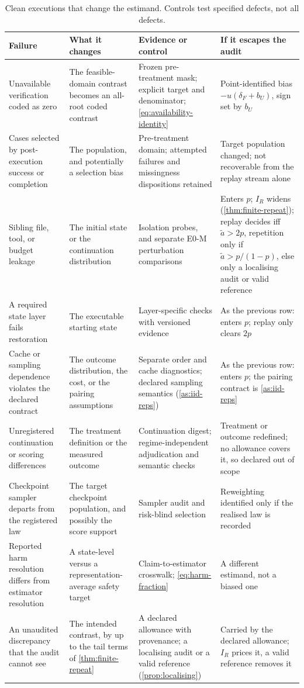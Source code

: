 \begin{table}[H]
\centering
\footnotesize
\setlength{\tabcolsep}{3.5pt}
\begin{tabular}{@{}p{2.7cm}p{3.1cm}p{4.0cm}p{4.4cm}@{}}
\toprule
Failure & What it changes & Evidence or control & If it escapes the audit \\
\midrule
Unavailable verification coded as zero & The feasible-domain contrast becomes an all-root coded contrast & Frozen pre-treatment mask; explicit target and denominator; \eqref{eq:availability-identity} & Point-identified bias $-u(\delta_F+b_U)$, sign set by $b_U$ \\
Cases selected by post-execution success or completion & The population, and potentially a selection bias & Pre-treatment domain; attempted failures and missingness dispositions retained & Target population changed; not recoverable from the replay stream alone \\
Sibling file, tool, or budget leakage & The initial state or the continuation distribution & Isolation probes, and separate E0-M perturbation comparisons & Enters $p$; $I_R$ widens (\cref{thm:finite-repeat}); replay decides iff $\tilde a>2p$, repetition only if $\tilde a>p/(1-p)$, else only a localising audit or valid reference \\
A required state layer fails restoration & The executable starting state & Layer-specific checks with versioned evidence & As the previous row: enters $p$; replay only clears $2p$ \\
Cache or sampling dependence violates the declared contract & The outcome distribution, the cost, or the pairing assumptions & Separate order and cache diagnostics; declared sampling semantics (\cref{as:iid-reps}) & As the previous row: enters $p$; the pairing contract is \cref{as:iid-reps} \\
Unregistered continuation or scoring differences & The treatment definition or the measured outcome & Continuation digest; regime-independent adjudication and semantic checks & Treatment or outcome redefined; no allowance covers it, so declared out of scope \\
Checkpoint sampler departs from the registered law & The target checkpoint population, and possibly the score support & Sampler audit and risk-blind selection & Reweighting identified only if the realised law is recorded \\
Reported harm resolution differs from estimator resolution & A state-level versus a representation-average safety target & Claim-to-estimator crosswalk; \eqref{eq:harm-fraction} & A different estimand, not a biased one \\
An unaudited discrepancy that the audit cannot see & The intended contrast, by up to the tail terms of \cref{thm:finite-repeat} & A declared allowance with provenance; a localising audit or a valid reference (\cref{prop:localising}) & Carried by the declared allowance; $I_R$ prices it, a valid reference removes it \\
\bottomrule
\end{tabular}
\caption{Clean executions that change the estimand.  Controls test specified defects, not all defects.}
\label{tab:failure-taxonomy}
\end{table}
